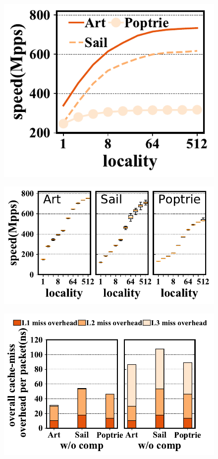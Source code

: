 \documentclass[a4paper]{article}
\begin{document}
    \begin{figure}[htbp]
        \includegraphics{../result/example1.pdf}
    \end{figure}

    \begin{figure}[htbp]
        \includegraphics{../result/example2.pdf}
    \end{figure}

    \begin{figure}[htbp]
        \includegraphics{../result/example3.pdf}
    \end{figure}
\end{document}
